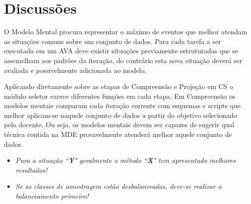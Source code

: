 \documentclass[12pt]{article}
\begin{document}






\section{Discussões}

O Modelo Mental procura representar o máximo de eventos que melhor atendam as situações comuns sobre um conjunto de dados. Para cada tarefa a ser executada em um AVA deve existir situações previamente estruturadas que se assemelham aos padrões da iteração, do contrário esta nova situação deverá ser avaliada e possivelmente adicionada ao modelo.

Aplicando diretamente sobre as etapas de Compreensão e Projeção em CS o módulo seletor exerce diferentes funções em cada etapa. Em Compreensão os modelos mentais comparam cada iteração corrente com esquemas e scripts que melhor aplicam-se naquele conjunto de dados a partir do objetivo selecionado pelo docente. Ou seja, os modelos mentais devem ser capazes de sugerir qual técnica contida na MDE provavelmente atenderá melhor aquele conjunto de dados.

\begin{itemize}	
	\item \textit{Para a situação ``\textbf{Y}" geralmente o método ``\textbf{X}" tem apresentado melhores resultados!}
	\item \textit{Se as classes de amostragem estão desbalanceadas, deve-se realizar o balanceamento primeiro!}
\end{itemize}
\end{document}

